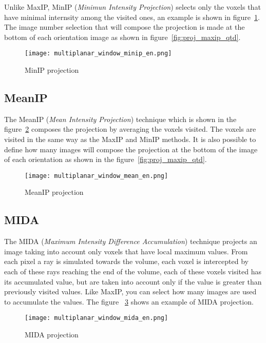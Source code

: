 Unlike MaxIP, MinIP (\textit{Minimun Intensity Projection}) selects only the voxels that have minimal internsity among the visited ones, an example is shown in figure~\ref{fig:proj_minIP}. The image number selection that will compose the projection is made at the bottom of each orientation image as shown in figure~\ref{fig:proj_maxip_qtd}.

\begin{figure}[!h]
\centering
\texttt{[image: multiplanar\_window\_minip\_en.png]}
\caption{MinIP projection}
\label{fig:proj_minIP}
\end{figure}

\subsection{MeanIP}
The MeanIP (\textit{Mean Intensity Projection}) technique which is shown in the figure~\ref{fig:proj_meanIP} composes the projection by averaging the voxels visited. The voxels are visited in the same way as the MaxIP and MinIP methods. It is also possible to define how many images will compose the projection at the bottom of the image of each orientation as shown in the figure~\ref{fig:proj_maxip_qtd}.

\begin{figure}[!h]
\centering
\texttt{[image: multiplanar\_window\_mean\_en.png]}
\caption{MeanIP projection}
\label{fig:proj_meanIP}
\end{figure}

\subsection{MIDA}
\label{sub:mida}
The MIDA (\textit{Maximum Intensity Difference Accumulation}) technique projects an image taking into account only voxels that have local maximum values. From each pixel a ray is simulated towards the volume, each voxel is intercepted by each of these rays reaching the end of the volume, each of these voxels visited has its accumulated value, but are taken into account only if the value is greater than previously visited values. Like MaxIP, you can select how many images are used to accumulate the values. The figure ~\ref{fig:proj_MIDA} shows an example of MIDA projection.

\begin{figure}[!h]
\centering
\texttt{[image: multiplanar\_window\_mida\_en.png]}
\caption{MIDA projection}
\label{fig:proj_MIDA}
\end{figure}

